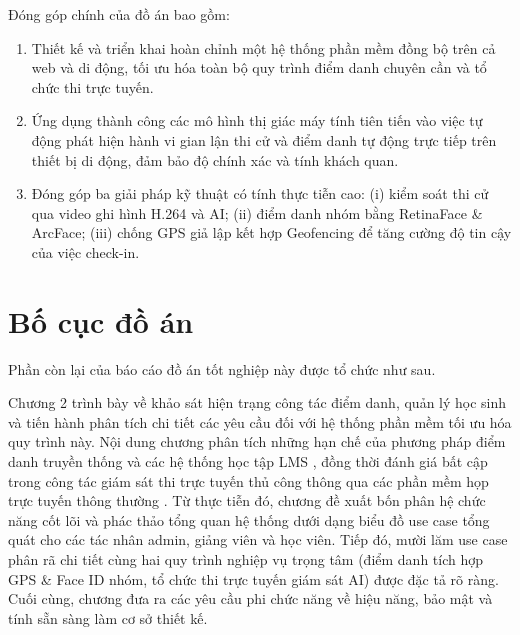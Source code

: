 \documentclass[../DoAn.tex]{subfiles}
\begin{document}
Đóng góp chính của đồ án bao gồm:
\begin{enumerate}
    \item Thiết kế và triển khai hoàn chỉnh một hệ thống phần mềm đồng bộ trên cả web và di động, tối ưu hóa toàn bộ quy trình điểm danh chuyên cần và tổ chức thi trực tuyến.
    \item Ứng dụng thành công các mô hình thị giác máy tính tiên tiến vào việc tự động phát hiện hành vi gian lận thi cử và điểm danh tự động trực tiếp trên thiết bị di động, đảm bảo độ chính xác và tính khách quan.
    \item Đóng góp ba giải pháp kỹ thuật có tính thực tiễn cao: (i) kiểm soát thi cử qua video ghi hình H.264 và AI; (ii) điểm danh nhóm bằng RetinaFace \& ArcFace; (iii) chống GPS giả lập kết hợp Geofencing để tăng cường độ tin cậy của việc check-in.
\end{enumerate}

\section{Bố cục đồ án}
\label{section:1.4}
Phần còn lại của báo cáo đồ án tốt nghiệp này được tổ chức như sau.

Chương 2 trình bày về khảo sát hiện trạng công tác điểm danh, quản lý học sinh và tiến hành phân tích chi tiết các yêu cầu đối với hệ thống phần mềm tối ưu hóa quy trình này. Nội dung chương phân tích những hạn chế của phương pháp điểm danh truyền thống và các hệ thống học tập LMS \cite{moodle_attendance_plugin}, đồng thời đánh giá bất cập trong công tác giám sát thi trực tuyến thủ công thông qua các phần mềm họp trực tuyến thông thường \cite{kaundinya2026inbrowser}. Từ thực tiễn đó, chương đề xuất bốn phân hệ chức năng cốt lõi và phác thảo tổng quan hệ thống dưới dạng biểu đồ use case tổng quát cho các tác nhân admin, giảng viên và học viên. Tiếp đó, mười lăm use case phân rã chi tiết cùng hai quy trình nghiệp vụ trọng tâm (điểm danh tích hợp GPS \& Face ID nhóm, tổ chức thi trực tuyến giám sát AI) được đặc tả rõ ràng. Cuối cùng, chương đưa ra các yêu cầu phi chức năng về hiệu năng, bảo mật và tính sẵn sàng làm cơ sở thiết kế.
\end{document}
